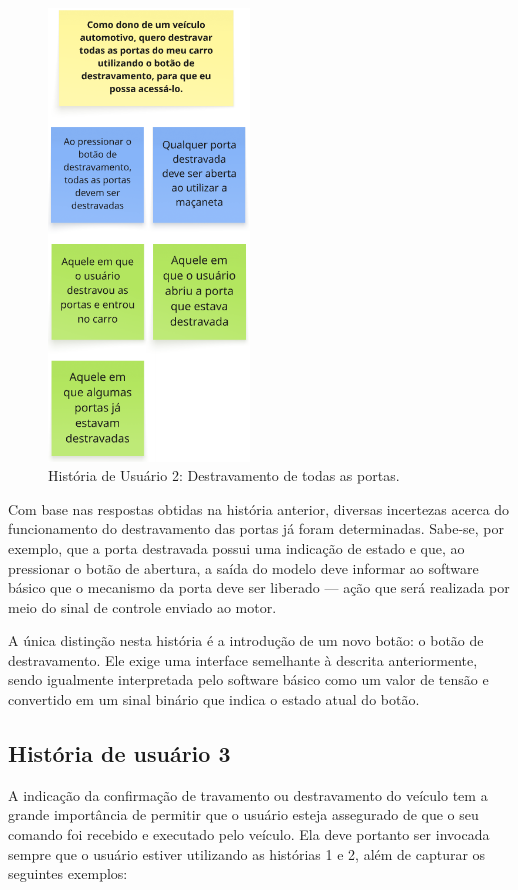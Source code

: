\begin{figure}[H]
\centering
\includegraphics[height=12cm]{figuras/user_story_2.png}
\caption{História de Usuário 2: Destravamento de todas as portas.}
\label{fig:historia2}
\end{figure}

Com base nas respostas obtidas na história anterior, diversas incertezas acerca do funcionamento do destravamento das portas já foram determinadas. Sabe-se, 
por exemplo, que a porta destravada possui uma indicação de estado e que, ao pressionar o botão de abertura, a saída do modelo deve informar ao software básico 
que o mecanismo da porta deve ser liberado — ação que será realizada por meio do sinal de controle enviado ao motor.

A única distinção nesta história é a introdução de um novo botão: o botão de destravamento. Ele exige uma interface semelhante à descrita anteriormente, sendo 
igualmente interpretada pelo software básico como um valor de tensão e convertido em um sinal binário que indica o estado atual do botão.

\subsection{História de usuário 3}

A indicação da confirmação de travamento ou destravamento do veículo tem a grande importância de permitir que o usuário esteja assegurado de que o seu comando foi 
recebido e executado pelo veículo. Ela deve portanto ser invocada sempre que o usuário estiver utilizando as histórias 1 e 2, além de capturar 
os seguintes exemplos:

